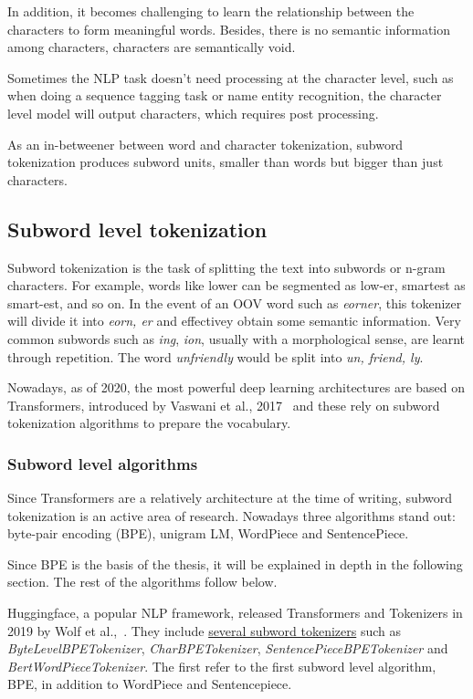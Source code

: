 In addition, it becomes challenging to learn the relationship between the characters to form meaningful words. Besides, there is no semantic information among characters, characters are semantically void.

Sometimes the NLP task doesn't need processing at the character level, such as when doing a sequence tagging task or name entity recognition, the character level model will output characters, which requires post processing.

As an in-betweener between word and character tokenization, subword tokenization produces subword units, smaller than words but bigger than just characters.

\subsection{Subword level tokenization}

Subword tokenization is the task of splitting the text into subwords or n-gram characters. For example, words like lower can be segmented as low-er, smartest as smart-est, and so on. In the event of an OOV word such as \emph{eorner}, this tokenizer will divide it into \emph{eorn, er} and effectivey obtain some semantic information. Very common subwords such as \emph{ing}, \emph{ion}, usually with a morphological sense, are learnt through repetition. The word \emph{unfriendly} would be split into \emph{un, friend, ly}.

Nowadays, as of 2020, the most powerful deep learning architectures are based on Transformers, introduced by Vaswani et al., 2017~\cite{vaswani2017attention} and these rely on subword tokenization algorithms to prepare the vocabulary.

\subsubsection{Subword level algorithms}

Since Transformers are a relatively architecture at the time of writing, subword tokenization is an active area of research. Nowadays three algorithms stand out: byte-pair encoding (BPE), unigram LM, WordPiece and SentencePiece.

Since BPE is the basis of the thesis, it will be explained in depth in the following section. The rest of the algorithms follow below.

Huggingface, a popular NLP framework, released Transformers and Tokenizers in 2019 by Wolf et al.,~\cite{wolf2019huggingfaces}. They include \href{https://github.com/huggingface/tokenizers/tree/74d812d40180032d2dbb6ca59e2e10f0257ef46b/bindings/python/tokenizers/implementations}{several subword tokenizers} such as \emph{ByteLevelBPETokenizer}, \emph{CharBPETokenizer}, \emph{SentencePieceBPETokenizer} and \emph{BertWordPieceTokenizer}. The first refer to the first subword level algorithm, BPE, in addition to WordPiece and Sentencepiece.

